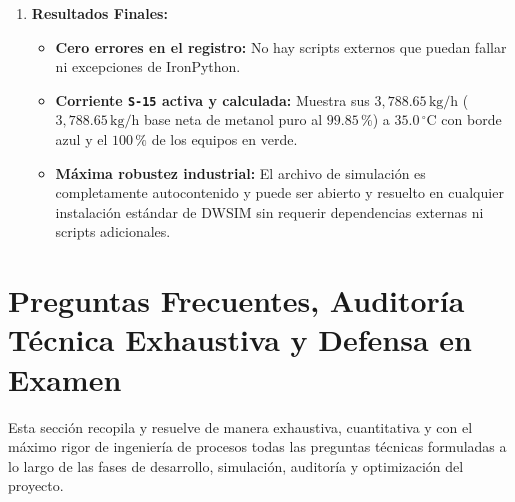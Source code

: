 \documentclass[11pt,a4paper]{article}
\begin{document}
\begin{enumerate}
    \begin{equation*}
        \text{\texttt{T-701}} \xrightarrow[\text{Destilado $65^\circ\text{C}$}]{S-15\_HOT} \text{\texttt{E-704}} \xrightarrow[\text{Producto $35^\circ\text{C}$}]{S-15}
    \end{equation*}
    El solver general de DWSIM resuelve secuencialmente todos los balances en una única corrida de menos de $5\,\text{segundos}$.
    \item \textbf{Resultados Finales:}
    \begin{itemize}
        \item \textbf{Cero errores en el registro:} No hay scripts externos que puedan fallar ni excepciones de IronPython.
        \item \textbf{Corriente \texttt{S-15} activa y calculada:} Muestra sus $3{,}788.65\,\text{kg/h}$ ($3{,}788.65\,\text{kg/h}$ base neta de metanol puro al $99.85\,\%$) a $35.0\,^\circ\text{C}$ con borde azul y el $100\,\%$ de los equipos en verde.
        \item \textbf{Máxima robustez industrial:} El archivo de simulación es completamente autocontenido y puede ser abierto y resuelto en cualquier instalación estándar de DWSIM sin requerir dependencias externas ni scripts adicionales.
    \end{itemize}
\end{enumerate}

\section{Preguntas Frecuentes, Auditoría Técnica Exhaustiva y Defensa en Examen}

Esta sección recopila y resuelve de manera exhaustiva, cuantitativa y con el máximo rigor de ingeniería de procesos todas las preguntas técnicas formuladas a lo largo de las fases de desarrollo, simulación, auditoría y optimización del proyecto.
\end{document}
